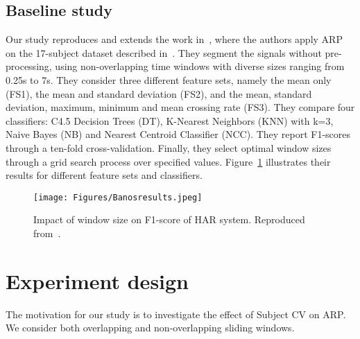 \documentclass[sigconf]{acmart}
\begin{document}
\subsection{Baseline study} \label{sub:theirwork}

Our study reproduces and extends the work in~\cite{banos2014window}, where the authors apply ARP on the 17-subject dataset
described in~\cite{banos2012benchmark}. They segment the signals without pre-processing, 
using non-overlapping time windows with diverse sizes ranging from 
0.25s to 7s. They consider three different feature sets, namely the
mean only (FS1), the mean and standard deviation (FS2), and the mean, 
standard deviation, maximum, minimum and mean crossing rate (FS3). They 
compare four classifiers: C4.5 Decision Trees (DT), K-Nearest Neighbors 
(KNN) with k=3, Naive Bayes (NB) and Nearest Centroid Classifier (NCC). 
They report F1-scores through a ten-fold cross-validation. 
Finally, they select optimal window sizes through a grid search process 
over specified values. Figure~\ref{fig:Banos et al result} illustrates their results for different feature sets and classifiers. 


\begin{figure}[htp]
    \centering
    \texttt{[image: Figures/Banosresults.jpeg]}
    \caption{Impact of window size on F1-score of HAR system. Reproduced from~\cite{banos2014window}.}
    \label{fig:Banos et al result}
\end{figure}



\section{Experiment design} \label{sec:experiment setting}
The motivation for our study is to investigate the effect of Subject CV on ARP. We consider both overlapping and non-overlapping sliding windows. 
\end{document}
